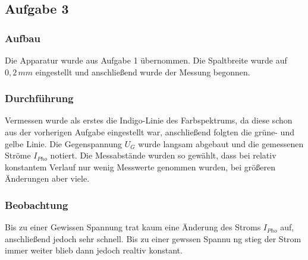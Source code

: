 \subsection{Aufgabe 3}
\subsubsection{Aufbau}
Die Apparatur wurde aus Aufgabe 1 übernommen. Die Spaltbreite wurde auf \(0,2\,mm\) eingestellt und anschließend wurde der Messung begonnen.
\subsubsection{Durchführung}
Vermessen wurde als erstes die Indigo-Linie des Farbspektrums, da diese schon aus der vorherigen Aufgabe eingestellt war, anschließend folgten die grüne- und gelbe Linie. Die Gegenspannung \(U_G\) wurde langsam abgebaut und die gemessenen Ströme \(I_{Pho}\) notiert. Die Messabstände wurden so gewählt, dass bei relativ konstantem Verlauf nur wenig Messwerte genommen wurden, bei größeren Änderungen aber viele.
\subsubsection{Beobachtung}
Bis zu einer Gewissen Spannung trat kaum eine Änderung des Stroms \(I_{Pho}\) auf, anschließend jedoch sehr schnell. Bis zu einer gewssen Spannu ng stieg der Strom immer weiter blieb dann jedoch realtiv konstant. \newpage
